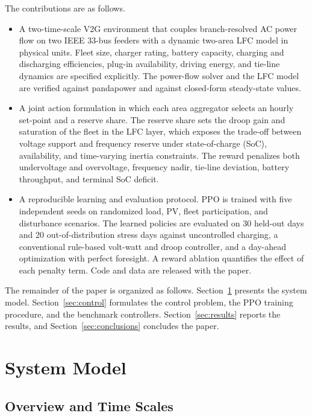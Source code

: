 The contributions are as follows.
\begin{itemize}
\item A two-time-scale V2G environment that couples branch-resolved AC
power flow on two IEEE 33-bus feeders with a dynamic two-area LFC model
in physical units. Fleet size, charger rating, battery capacity,
charging and discharging efficiencies, plug-in availability, driving
energy, and tie-line dynamics are specified explicitly. The power-flow
solver and the LFC model are verified against pandapower
\cite{Thurner2018} and against closed-form steady-state values.

\item A joint action formulation in which each area aggregator selects
an hourly set-point and a reserve share. The reserve share sets the
droop gain and saturation of the fleet in the LFC layer, which exposes
the trade-off between voltage support and frequency reserve under
state-of-charge (SoC), availability, and time-varying inertia
constraints. The reward penalizes both undervoltage and overvoltage,
frequency nadir, tie-line deviation, battery throughput, and terminal
SoC deficit.

\item A reproducible learning and evaluation protocol. PPO is trained
with five independent seeds on randomized load, PV, fleet
participation, and disturbance scenarios. The learned policies are
evaluated on 30 held-out days and 20 out-of-distribution stress days
against uncontrolled charging, a conventional rule-based volt-watt and
droop controller, and a day-ahead optimization with perfect foresight.
A reward ablation quantifies the effect of each penalty term. Code and
data are released with the paper.
\end{itemize}

The remainder of the paper is organized as follows.
Section~\ref{sec:model} presents the system model.
Section~\ref{sec:control} formulates the control problem, the PPO
training procedure, and the benchmark controllers.
Section~\ref{sec:results} reports the results, and
Section~\ref{sec:conclusions} concludes the paper.

\section{System Model}
\label{sec:model}

\subsection{Overview and Time Scales}

